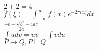 \documentclass{article}
\begin{document}
\maketitle
$2 + 2 = 4$\\
$\hat{f}(\xi)=\int_{-\infty}^{\infty} f(x) e^{-2 \pi i x \xi} d x$\\
$\frac{-b \pm \sqrt{b^{2}-4 a c}}{2 a}$\\
$\int u d v=u v-\int v d u$\\
$P\rightarrow Q, P\vdash Q$
\end{document}
